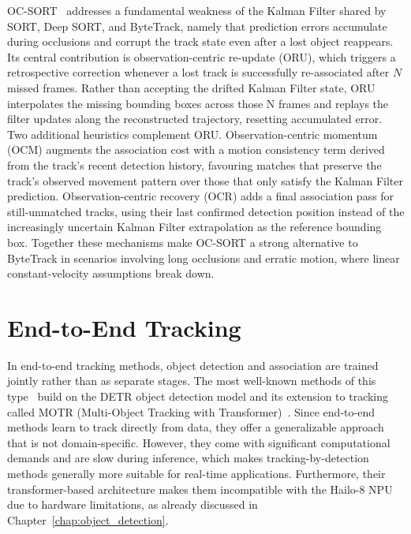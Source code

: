 \documentclass[12pt,oneside,bibtotoc,liststotoc]{scrbook}
\begin{document}
OC-SORT~\cite{cao2023OCSORT} addresses a fundamental weakness of the Kalman Filter shared by SORT, Deep SORT, and
ByteTrack, namely that prediction errors accumulate during occlusions and corrupt the track state
even after a lost object reappears. Its central contribution is observation-centric re-update (ORU),
which triggers a retrospective correction whenever a lost track is successfully re-associated after
$N$ missed frames. Rather than accepting the drifted Kalman Filter state, ORU interpolates the
missing bounding boxes across those N frames and replays the filter updates along the reconstructed
trajectory, resetting accumulated error. Two additional heuristics complement ORU. Observation-centric
momentum (OCM) augments the association cost with a motion consistency term derived from the
track's recent detection history, favouring matches that preserve the track's observed movement
pattern over those that only satisfy the Kalman Filter prediction. Observation-centric recovery
(OCR) adds a final association pass for still-unmatched tracks, using their last confirmed
detection position instead of the increasingly uncertain Kalman Filter extrapolation as the
reference bounding box. Together these mechanisms make OC-SORT a strong alternative to ByteTrack
in scenarios involving long occlusions and erratic motion, where linear constant-velocity assumptions
break down.

\vspace{-2em}
\section{End-to-End Tracking}
\label{sec:end_to_end_tracking}
\vspace{-0.5em}

In end-to-end tracking methods, object detection and association are trained jointly rather than as separate stages.
The most well-known methods of this type~\cite{zeng2022motr, zhang2023motrv2, yu2023motrv3, cai2022memot, gao2023memotr} build on the DETR
object detection model and its extension to tracking called MOTR
(Multi-Object Tracking with Transformer)~\cite{zeng2022motr}.
Since end-to-end methods learn to track directly from data, they offer a generalizable approach that is not domain-specific.
However, they come with significant computational demands and are slow during inference, which makes tracking-by-detection methods
generally more suitable for real-time applications. Furthermore, their transformer-based architecture makes them incompatible with
the Hailo-8 NPU due to hardware limitations, as already discussed in Chapter~\ref{chap:object_detection}.
\cite{advzemovic2025deepLearningMultiObjectTrackingSurvey}
\end{document}
